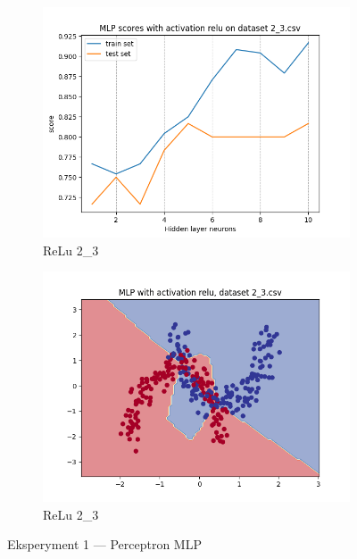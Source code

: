 \documentclass[12pt]{article}
\newcommand*{\subfigwidth}{0.24\textwidth}
\begin{document}
\begin{figure}[H]
\begin{subfigure}[t]{\subfigwidth}
        \includegraphics[width=\linewidth]{img/exp_1/mlp/2_3/relu/scores.png}
        \caption{ReLu 2\_3}
    \end{subfigure}
    \hfill
    \begin{subfigure}[t]{\subfigwidth}
        \includegraphics[width=\linewidth]{img/exp_1/mlp/2_3/relu/boundary.png}
        \caption{ReLu 2\_3}
    \end{subfigure}
    \caption{Eksperyment 1 --- Perceptron MLP}\label{fig:figure}
\end{figure}
\end{document}

